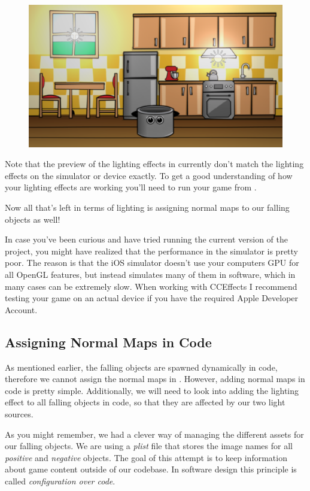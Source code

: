 \begin{figure}[H]
  \centering
  \includegraphics[width=350pt]{images/Chapter9/lighting_finished.png}
\end{figure}

Note that the preview of the lighting effects in \SB{} currently don't match the
lighting effects on the simulator or device exactly. To get a good understanding
of how your lighting effects are working you'll need to run your game from
\xcode{}.

Now all that's left in terms of lighting is assigning normal maps to
our falling objects as well!

\begin{details}
In case you've been curious and have tried running the current version of the
project, you might have realized that the performance in the simulator is
pretty poor. The reason is that the iOS simulator doesn't use your computers
GPU for all OpenGL features, but instead simulates many of them in software,
which in many cases can be extremely slow. When working with CCEffects I 
recommend testing your game on an actual device if you have the required Apple
Developer Account.
\end{details}

\subsection{Assigning Normal Maps in Code}
As mentioned earlier, the falling objects are spawned dynamically in code,
therefore we cannot assign the normal maps in \SB{}. However, adding normal
maps in code is pretty simple. Additionally, we will need to look into
adding the lighting effect to all falling objects in code, so that they are
affected by our two light sources.

As you might remember, we had a clever way of managing the different assets for
our falling objects. We are using a \textit{plist} file that stores the image
names for all \textit{positive} and \textit{negative} objects. The goal of this
attempt is to keep information about game content outside of our codebase. In
software design this principle is called \textit{configuration over code}.

